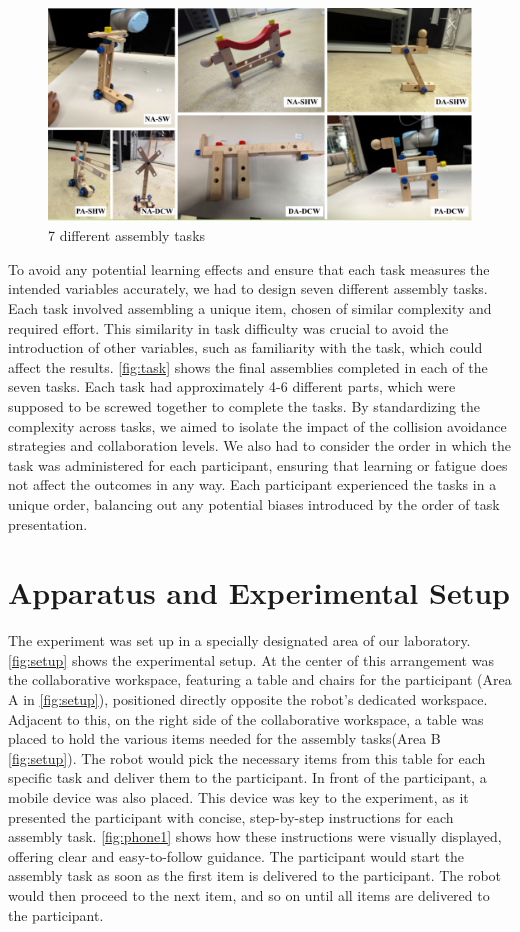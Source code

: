 \begin{figure}[h]
	\centering
	\includegraphics[width=0.8\columnwidth]{images/tasks.drawio.pdf}
	\caption{7 different assembly tasks}
	\label{fig:task}
\end{figure}


To avoid any potential learning effects and ensure that each task measures the intended
variables accurately, we had to design seven different assembly tasks. Each task involved
assembling a unique item, chosen of similar complexity and required effort. This
similarity in task difficulty was crucial to avoid the introduction of other variables, such
as familiarity with the task, which could affect the results.   \autoref{fig:task} shows the final assemblies completed in each of the seven tasks. Each task had approximately 4-6 different
parts, which were supposed to be screwed together to complete the tasks. By standardizing
the complexity across tasks, we aimed to isolate the impact of the collision avoidance
strategies and collaboration levels. We also had to consider the order in which the task
was administered for each participant, ensuring that learning or fatigue does not affect the
outcomes in any way. Each participant experienced the tasks in a unique order, balancing out any potential biases introduced by the order of task presentation.


\section{Apparatus and Experimental Setup} \label{sec:expprot}
The experiment was set up in a specially designated area of our laboratory. \autoref{fig:setup} shows the experimental setup. 
 At the center of this arrangement was the collaborative workspace, featuring a table and chairs for the participant (Area A in  \autoref{fig:setup}), positioned directly opposite the robot's dedicated workspace. Adjacent to this, on the right side of the collaborative workspace, a table was placed to hold the various items needed for the assembly tasks(Area B \autoref{fig:setup}). The robot would pick the necessary items from this table for each specific task and deliver them to the participant. In front of the participant, a mobile device was also placed. This device was key to the experiment, as it presented the participant with concise, step-by-step instructions for each assembly task. \autoref{fig:phone1} shows how these instructions were visually displayed, offering clear and easy-to-follow guidance. The participant would start the assembly task as soon as the first item is delivered to the participant. The robot would then proceed to the next item, and so on until all items are delivered to the participant.



